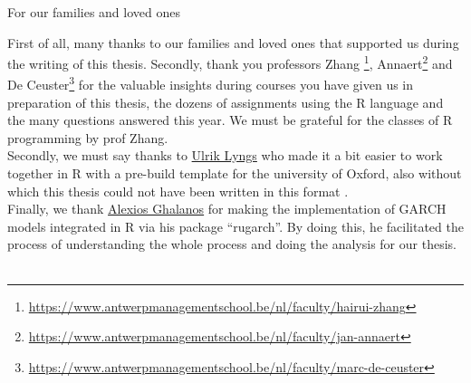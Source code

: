 \documentclass[a4paper, twoside]{templates/ociamthesis}
\begin{document}
\setcounter{secnumdepth}{2}
\setcounter{tocdepth}{2}



\begin{romanpages}

\maketitle

\begin{dedication}
  For our families and loved ones
\end{dedication}

\begin{acknowledgements}
 	First of all, many thanks to our families and loved ones that supported us during the writing of this thesis. Secondly, thank you professors Zhang \footnote{\url{https://www.antwerpmanagementschool.be/nl/faculty/hairui-zhang}}, Annaert\footnote{\url{https://www.antwerpmanagementschool.be/nl/faculty/jan-annaert}} and De Ceuster\footnote{\url{https://www.antwerpmanagementschool.be/nl/faculty/marc-de-ceuster}} for the valuable insights during courses you have given us in preparation of this thesis, the dozens of assignments using the R language and the many questions answered this year. We must be grateful for the classes of R programming by prof Zhang. ~\\

  \noindent Secondly, we must say thanks to \href{https://www.cs.ox.ac.uk/people/ulrik.lyngs/}{Ulrik Lyngs} who made it a bit easier to work together in R with a pre-build template for the university of Oxford, also without which this thesis could not have been written in this format \autocite{lyngsOxforddown2019}. ~\\

  \noindent Finally, we thank \href{https://www.linkedin.com/in/alexios-galanos-64309165/}{Alexios Ghalanos} for making the implementation of GARCH models integrated in R via his package ``rugarch''. By doing this, he facilitated the process of understanding the whole process and doing the analysis for our thesis. ~\\


\end{acknowledgements}
\end{romanpages}
\end{document}
